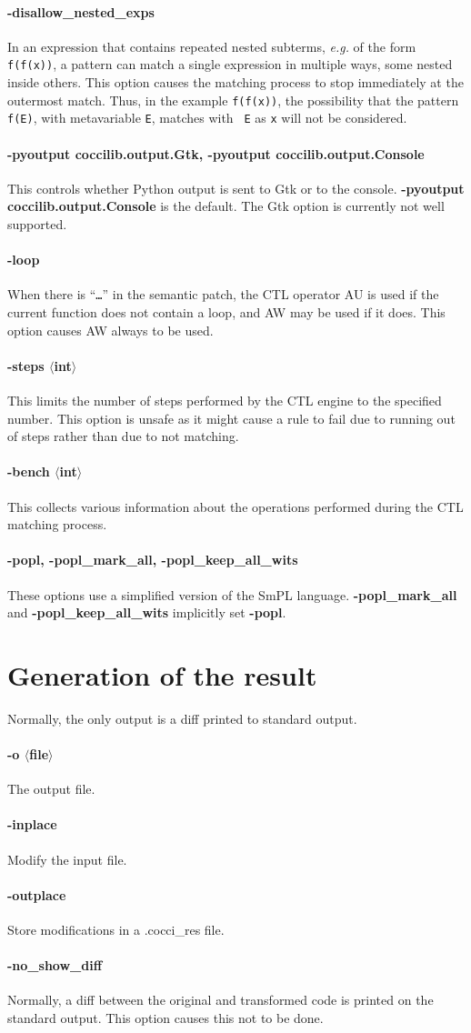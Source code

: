 \documentclass{article}
\newcommand{\rare}[2]{\paragraph*{\makebox[0in][r]{\BigDiamondshape\,\,} {{#1}}} {#2}}
\newcommand{\developer}[2]{\paragraph*{{#1}} {#2}}
\begin{document}
\rare{-disallow\_nested\_exps}{In an expression that contains repeated
  nested subterms, {\em e.g.} of the form {\tt f(f(x))}, a pattern can
  match a single expression in multiple ways, some nested inside others.
  This option causes the matching process to stop immediately at the
  outermost match.  Thus, in the example {\tt f(f(x))}, the possibility
  that the pattern {\tt f(E)}, with metavariable {\tt E}, matches with {\tt
    E} as {\tt x} will not be considered.}

\rare{-pyoutput coccilib.output.Gtk, -pyoutput coccilib.output.Console}{
This controls whether Python output is sent to Gtk or to the console.  {\bf
  -pyoutput coccilib.output.Console} is the default.  The Gtk option is
currently not well supported.}

\developer{-loop}{When there is ``{\tt{\ldots}}'' in the semantic patch,
  the CTL operator {\sf AU} is used if the current function does not
  contain a loop, and {\sf AW} may be used if it does.  This option causes
  {\sf AW} always to be used.}

\developer{-steps $\langle$int$\rangle$}{
This limits the number of steps performed by the CTL engine to the
specified number.  This option is unsafe as it might cause a rule to fail
due to running out of steps rather than due to not matching.}

\developer{-bench $\langle$int$\rangle$}{This collects various information
  about the operations performed during the CTL matching process.}

\developer{-popl, -popl\_mark\_all, -popl\_keep\_all\_wits}{
These options use a simplified version of the SmPL language.  {\bf
  -popl\_mark\_all} and {\bf -popl\_keep\_all\_wits} implicitly set {\bf
  -popl}.}

\section{Generation of the result}

Normally, the only output is a diff printed to standard output.

\rare{-o $\langle$file$\rangle$}{ The output file.}

\rare{-inplace}{ Modify the input file.}

\rare{-outplace}{ Store modifications in a .cocci\_res file.}

\rare{-no\_show\_diff}{ Normally, a diff between the original and transformed
code is printed on the standard output.  This option causes this not to be
done.}
\end{document}
